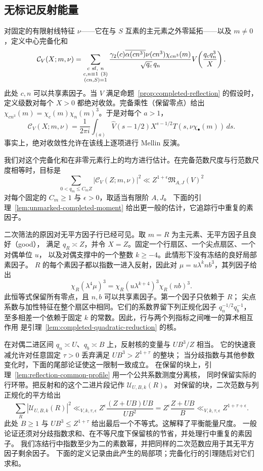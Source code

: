 \documentclass[11pt,a4paper]{article}
\numberwithin{equation}{section}
\numberwithin{figure}{section}
\theoremstyle{definition}
\theoremstyle{remark}
\begin{document}
\subsection{无标记反射能量}

对固定的有限射线特征 $\nu$——它在与 $S$ 互素的主元素之外零延拓——以及 $m\ne0$，定义中心完备化和
\begin{equation}\label{eq:unmarked-central-completion}
 \mathcal C_V(X;m,\nu)=
 \sum_{\substack{c\ {\rm sf},\ n\\c,n\equiv1\ (3)\\(cn,S)=1}}
 \frac{\gamma_2(c)\overline{\alpha(cn^3)}\nu(cn^3)\chi_{cn^3}(m)}
      {\sqrt{q_c}\,q_n}
 V\!\left(\frac{q_cq_n^3}{X}\right).
\end{equation}
此处 $c,n$ 可以共享素因子。当 $V$ 满足命题~\ref{prop:completed-reflection} 的假设时，
定义级数对每个 $X>0$ 都绝对收敛。完备乘性（保留零点）给出
$\chi_{cn^3}(m)=\chi_c(m)\chi_n(m)^3$。于是对每个 $a>1$，
\begin{equation}\label{eq:unmarked-central-mellin}
 \mathcal C_V(X;m,\nu)=\frac1{2\pi i}\int_{(a)}
 \widehat V(s-1/2)X^{s-1/2}T(s,\nu\chi_\bullet(m))\,ds.
\end{equation}
事实上，绝对收敛性允许在该线上逐项进行 Mellin 反演。


我们对这个完备化和在非零元素行上的均方进行估计。在完备范数尺度与行范数尺度相等时，目标是
\[
 \sum_{0<q_m\le C_mZ}|\mathcal C_V(Z;m,\nu)|^2
 \ll Z^{1+\epsilon}\mathfrak M_{A,J}(V)^2
\]
对每个固定的 $C_m\ge1$ 与 $\epsilon>0$，取适当有限阶 $A,J$。
下面的引理~\ref{lem:unmarked-completed-moment} 给出更一般的估计，它追踪行中重复的素因子。

二次筛法的原因对无平方因子行已经可见。取 $m=R$ 为主元素、无平方因子且良好（good），
满足 $q_R\asymp Z$，并令 $X=Z$。固定一个行扇区、一个尖点扇区、一个对偶单位 $u$，
以及对偶支撑中的一个整数 $k\ge-4$。此情形下没有冻结的良好局部素因子。
$R$ 的每个素因子都以指数一进入反射，因此对 $\mu=u\lambda^k n b^3$，其列因子给出
\[
 \chi_R(\lambda^4\mu)^3
 =\chi_R(u\lambda^{k+4})^3\chi_R(nb)^3.
\]
此恒等式保留所有零点，且 $n,b$ 可以共享素因子。第一个因子只依赖于 $R$；
尖点系数与加性特征在整个扇区中相同。它们的系数界留下列正规化因子 $q_n^{-1/2}q_b^{-1}$，
至多相差一个依赖于固定 $k$ 的常数。因此，行与两个列指标之间唯一的算术相互作用
是引理~\ref{lem:completed-quadratic-reduction} 的核。

在对偶二进区间 $q_n\asymp U$、$q_b\asymp B$ 上，反射核的变量与 $UB^3/Z$ 相当。
它的快速衰减允许对任意固定 $\tau>0$ 丢弃满足 $UB^3>Z^{1+\tau}$ 的整块；
当分歧指数与其他参数变化时，下面的尾部论证使这一限制一致成立。
在保留的块上，引理~\ref{lem:reflection-common-profile} 用一个公共系数测度分离核，
同时保留实际的行环带。把反射和的这个二进片段记作 $\mathcal U_{U,B,k}(R)$。
对保留的块，二次范数与列正规化的平方给出
\[
 \sum_R|\mathcal U_{U,B,k}(R)|^2
 \ll_{V,k,\tau,\epsilon}Z^\epsilon
       \frac{(Z+UB)UB}{UB^2}
 =Z^\epsilon\frac{Z+UB}{B}
 \ll_{V,k,\tau,\epsilon}Z^{1+\tau+\epsilon}.
\]
此处 $B\ge1$ 与 $UB^3\le Z^{1+\tau}$ 给出最后一个不等式。这解释了平衡能量尺度。
一般论证还须对分歧指数求和、在不等尺度下保留核的节省，并处理行中重复的素因子。
我们冻结行中指数至少为二的素数幂，并把同样的二次范数应用于其无平方因子剩余因子。
下面的定义记录由此产生的局部项；完备化行的引理随后对它们求和。
\end{document}
